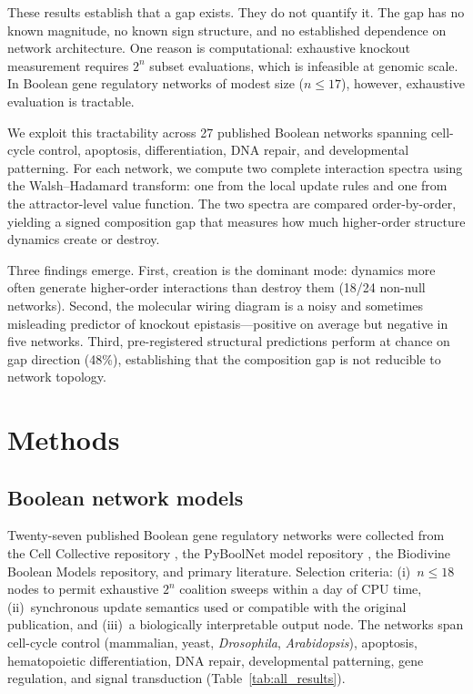 \documentclass[10pt]{article}
\begin{document}
These results establish that a gap exists. They do not quantify it.
The gap has no known magnitude, no known sign structure, and no
established dependence on network architecture. One reason is
computational: exhaustive knockout measurement requires $2^n$ subset
evaluations, which is infeasible at genomic scale. In Boolean gene
regulatory networks of modest size ($n \leq 17$), however, exhaustive
evaluation is tractable.

We exploit this tractability across 27 published Boolean networks
spanning cell-cycle control, apoptosis, differentiation, DNA repair,
and developmental patterning. For each network, we compute two
complete interaction spectra using the Walsh--Hadamard transform: one
from the local update rules and one from the attractor-level value
function. The two spectra are compared order-by-order, yielding a
signed composition gap that measures how much higher-order structure
dynamics create or destroy.

Three findings emerge. First, creation is the dominant mode: dynamics
more often generate higher-order interactions than destroy them (18/24
non-null networks). Second, the molecular wiring diagram is a noisy
and sometimes misleading predictor of knockout epistasis---positive on
average but negative in five networks. Third, pre-registered
structural predictions perform at chance on gap direction (48\%),
establishing that the composition gap is not reducible to network
topology.


\section{Methods}
\label{sec:methods}

\subsection{Boolean network models}
\label{sec:models}

Twenty-seven published Boolean gene regulatory networks were collected
from the Cell Collective repository \citep{helikar2012cell}, the
PyBoolNet model repository \citep{klarner2017pyboolnet}, the Biodivine
Boolean Models repository, and primary literature. Selection criteria:
(i)~$n \leq 18$ nodes to permit exhaustive $2^n$ coalition sweeps
within a day of CPU time, (ii)~synchronous update semantics used or
compatible with the original publication, and (iii)~a biologically
interpretable output node. The networks span cell-cycle control
(mammalian, yeast, \emph{Drosophila}, \emph{Arabidopsis}), apoptosis,
hematopoietic differentiation, DNA repair, developmental patterning,
gene regulation, and signal transduction (Table~\ref{tab:all_results}).
\end{document}
